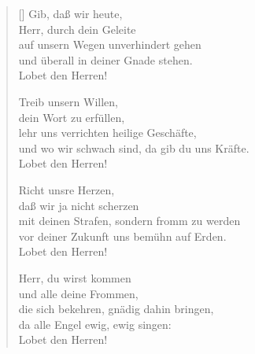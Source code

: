 \begin{multicols}{2}
\begin{verse}[\versewidth]
 Gib, daß wir heute,\\
Herr, durch dein Geleite\\
auf unsern Wegen unverhindert gehen\\
und überall in deiner Gnade stehen.\\
Lobet den Herren!

 Treib unsern Willen,\\
dein Wort zu erfüllen,\\
lehr uns verrichten heilige Geschäfte,\\
und wo wir schwach sind, da gib du uns Kräfte.\\
Lobet den Herren!

 Richt unsre Herzen,\\
daß wir ja nicht scherzen\\
mit deinen Strafen, sondern fromm zu werden\\
vor deiner Zukunft uns bemühn auf Erden.\\
Lobet den Herren!

 Herr, du wirst kommen\\
und alle deine Frommen,\\
die sich bekehren, gnädig dahin bringen,\\
da alle Engel ewig, ewig singen:\\
Lobet den Herren!

\end{verse}
\end{multicols}
